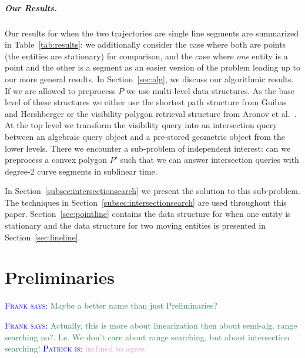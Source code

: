 \documentclass[UKenglish]{lipics-v2019}
\newcommand{\myremark}[4]{\textcolor{blue}{\textsc{#1 #2:}} \textcolor{#4}{\textsf{#3}}}
\newcommand{\frank}[2][says]{\myremark{Frank}{#1}{#2}{SeaGreen}}
\newcommand{\patrick}[2][says]{\myremark{Patrick}{#1}{#2}{Plum}}
\newcommand{\etal}{\textnormal{et al.}\xspace}
\begin{document}
\subparagraph {Our Results.}
  Our results for when the two trajectories are single line segments are summarized in Table~\ref {tab:results}; we additionally consider the case where both are points (the entities are stationary) for comparison, and the case where {\em one} entity is a point and the other is a segment as an easier version of the problem leading up to our more general results.
  In Section~\ref{sec:alg}, we discuss our algorithmic results.
  If we are allowed to preprocess $P$ we use multi-level data structures. As the base level of these structures we either use the shortest path structure from Guibas and Hershberger \cite{guibas1989optimal} or the visibility polygon retrieval structure from Aronov \etal~\cite{aronov2002visibility}. At the top level we transform the visibility query into an intersection query between an algebraic query object and a pre-stored geometric object from the lower levels. There we encounter a sub-problem of independent interest: can we preprocess a convex polygon $P'$ such that we can answer intersection queries with degree-2 curve segments in sublinear time. 
  
  In Section~\ref{subsec:intersectionsearch} we present the solution to this sub-problem. The techniques in Section~\ref{subsec:intersectionsearch} are used throughout this paper. Section~\ref{sec:pointline} contains the data structure for when one entity is stationary and the data structure for two moving entities is presented in Section~\ref{sec:lineline}.

  
\section{Preliminaries}
\label{sec:prelims}

\frank{Maybe a better name than just Preliminaries?}

\frank{Actually, this is more about linearization then about
  semi-alg. range searching no?. I.e. We don't care about range
  searching, but about intersection searching!} \patrick[is]{inclined to agree}
\end{document}
